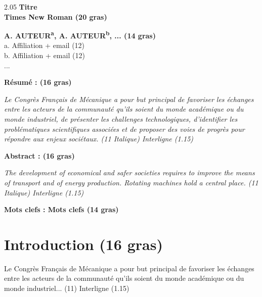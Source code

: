 \documentclass[11pt,a4paper]{article}
\begin{document}



\begin{center}
\begin{spacing}{2.05}
{\fontsize{20}{20}
\bf
Titre\\ 
Times New Roman (20 gras)
}
\end{spacing}
\end{center}
\vspace{-1.25cm}
\begin{center}
{\fontsize{14}{20}
\bf
A. AUTEUR\textsuperscript{a}, A. AUTEUR\textsuperscript{b}, ... (14 gras)\\
\bigskip
}
{\fontsize{12}{20}
a. Affiliation + email (12)\\
b. Affiliation + email (12)\\
...\\
}
\end{center}

\vspace{10pt}

{\fontsize{16}{20}
\bf
R\'esum\'e : (16 gras)
}
\medskip

\textit{Le Congr\`es Fran\c{c}ais de M\'ecanique a pour but principal de favoriser les 
\'echanges entre les acteurs de la communaut\'e qu'ils soient du monde acad\'emique 
ou du monde industriel, de pr\'esenter les challenges technologiques, d'identifier 
les probl\'ematiques scientifiques associ\'ees et de proposer des voies de progr\`es 
pour r\'epondre aux enjeux soci\'etaux. (11 Italique) Interligne (1.15)}

\vspace{20pt}

{\fontsize{16}{20}
\bf
Abstract : (16 gras)
}
\bigskip

\textit{The development of economical and safer societies requires to improve the 
means of transport and of energy production. Rotating machines hold a central place. 
(11 Italique) Interligne (1.15)}

\vspace{28pt}

{\fontsize{14}{20}
\bf
Mots clefs : Mots clefs (14 gras)
}

\section{Introduction (16 gras)}
\medskip
Le Congr\`es Fran\c{c}ais de M\'ecanique a pour but principal de favoriser les 
\'echanges entre les acteurs de la communaut\'e qu'ils soient du monde acad\'emique 
ou du monde industriel... (11) Interligne (1.15)
\end{document}
